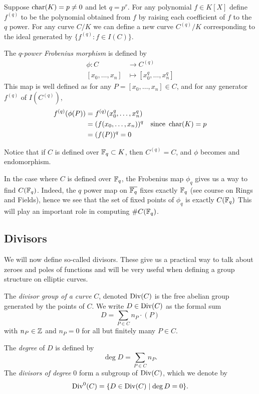 \begin{definition}
	Suppose $\operatorname{char}(K) = p \neq 0$ and let $q = p^r$.
	For any polynomial $f \in K[X]$ define $f^{(q)}$ to be the polynomial
	obtained from $f$ by raising each coefficient of 
	$f$ to the $q$ power.
	For any curve $C/K$ we can define a new curve $C^{(q)}/K$ corresponding
	to the ideal generated by $\{f^{(q)}: f \in I(C)\}$.	

	The $q$-\emph{power Frobenius morphism} is defined by
	\begin{align*}
		\phi: C &\to C^{(q)}\\
		[x_0, \dots, x_n] &\mapsto [x_0^q, \dots, x_n^q]
	\end{align*}
	This map is well defined as for any $P = [x_0, \dots, x_n] \in C$, and
	for any generator $f^{(q)}$ of $I(C^{(q)})$,
	\begin{align*}
		f^{(q)}(\phi(P)) &= f^{(q)}(x_0^q, \dots, x_n^q)\\
		&= (f(x_0, \dots, x_n))^q&\textrm{since }\operatorname{char}(K) = p\\
		&= (f(P))^q = 0
	\end{align*}
	
	Notice that if
	$C$ is defined over $\mathbb{F}_q \subset K$, then $C^{(q)} = C$,
	and $\phi$ becomes and endomorphism.
\end{definition}

In the case where $C$ is defined over $\mathbb{F}_q$, the Frobenius map $\phi_q$
gives us a way to find $C(\mathbb{F}_q)$. Indeed, the $q$ power map
on $\overline{\mathbb{F}_q}$ fixes exactly $\mathbb{F}_q$ (see course on Rings and Fields),
hence we see that the set of fixed points of $\phi_q$ is exactly $C(\mathbb{F}_q)$
This will play an important role in computing $\#C(\mathbb{F}_q)$.

\subsection{Divisors}

We will now define so-called divisors. These give us a practical way
to talk about zeroes and poles of functions and will be very useful when
defining a group structure on elliptic curves.

\begin{definition}
	The \emph{divisor group of a curve} $C$, denoted $\operatorname{Div}(C)$ is the free
	abelian group generated by the points of $C$. We write $D \in \operatorname{Div}(C)$ as
	the formal sum
	\begin{equation*}
		D = \sum_{P \in C} n_P\cdot(P)
	\end{equation*}
	with $n_P \in \mathbb{Z}$ and $n_P = 0$ for all but finitely many $P \in C$.

	The \emph{degree} of $D$ is defined by
	\begin{equation*}
		\deg D = \sum_{P \in C} n_P.
	\end{equation*}
	The \emph{divisors of degree} 0 form a subgroup of $\operatorname{Div}(C)$, which we denote
	by
	\begin{equation*}
		\operatorname{Div}^0(C) = \{D \in \operatorname{Div}(C) \mid \deg D = 0\}.
	\end{equation*}
\end{definition}

